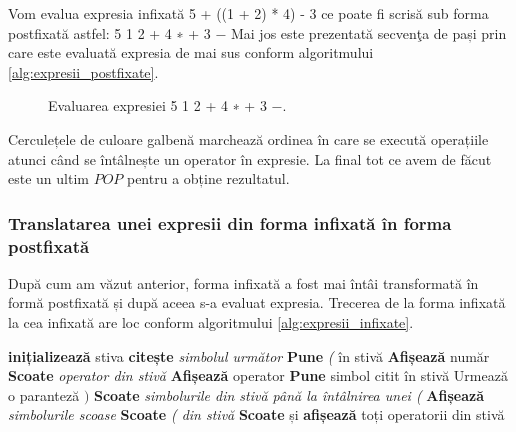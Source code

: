 Vom evalua expresia infixată 5 + ((1 + 2) * 4) - 3 ce poate fi scrisă sub forma
postfixată astfel:
 5 1 2 + 4 ∗ + 3 −
Mai jos este prezentată secvenţa de pași prin care este evaluată expresia de mai sus conform algoritmului \ref{alg:expresii_postfixate}.

\begin{figure}[H] 
	\centering	
	{
	}
	\caption{Evaluarea expresiei  5 1 2 + 4 ∗ + 3 −.} 
	\label{fig:stackpostfix}
\end{figure}

Cerculețele de culoare galbenă marchează ordinea în care se execută operațiile atunci când se întâlnește un operator în expresie. 
La final tot ce avem de făcut este un ultim $POP$ pentru a obține rezultatul.

\subsubsection{Translatarea unei expresii din forma infixată în forma postfixată}

După cum am văzut anterior, forma infixată a fost mai întâi transformată în formă postfixată și după aceea s-a evaluat expresia. Trecerea de la forma infixată la cea infixată are loc conform algoritmului \ref{alg:expresii_infixate}.

\begin{algorithm} [H]
	\caption{}\label{alg:expresii_infixate}
	\begin{algorithmic}[1]
		\State \textbf{inițializează} stiva
		\State \textbf{citește} \textit{simbolul următor}	
		\State \textbf{Pune} \textit{(}	în stivă
		\Else 
			\State \textbf{Afișează} număr
			\Else 
				\State \textbf{Scoate} \textit{operator din stivă}
				\State \textbf{Afișează} operator				
				\EndIf		
				\State \textbf{Pune} simbol citit în stivă
				\Else \Comment Urmează o paranteză $)$
					\State \textbf{Scoate} \textit{simbolurile din stivă până la întâlnirea unei (}
					\State \textbf{Afișează} \textit{simbolurile scoase}
					\State \textbf{Scoate} \textit{( din stivă}
				\EndIf	
			\EndIf			
		\EndIf		
		\EndWhile
		\State \textbf{Scoate} și \textbf{afișează}	toți operatorii din stivă
	\end{algorithmic}
\end{algorithm}

